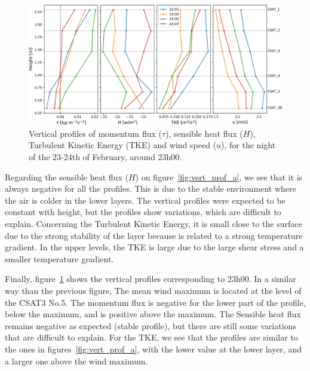 \begin{figure}[!ht]
    \centering
    \includegraphics[width=1\textwidth]{fig/chapter_4/23-24/vert_prof_b_speedmax.png}
    \caption{Vertical profiles of momentum flux ($\tau$), sensible heat flux ($H$), Turbulent Kinetic Energy (TKE) and wind speed ($u$), for the night of the 23-24th of February, around 23h00.}
    \label{fig:vert_prof_b}
\end{figure}

Regarding the sensible heat flux ($H$) on figure~\ref{fig:vert_prof_a}, we see that it is always negative for all the profiles. This is due to the stable environment where the air is colder in the lower layers. The vertical profiles were expected to be constant with height, but the profiles show variations, which are difficult to explain. Concerning the Turbulent Kinetic Energy, it is small close to the surface due to the strong stability of the layer because is related to a strong temperature gradient. In the upper levels, the TKE is large due to the large shear stress and a smaller temperature gradient.

Finally, figure~\ref{fig:vert_prof_b} shows the vertical profiles corresponding to 23h00. In a similar way than the previous figure, The mean wind maximum is located at the level of the CSAT3 No.5. The momentum flux is negative for the lower part of the profile, below the maximum, and is positive above the maximum. The Sensible heat flux remains negative as expected (stable profile), but there are still some variations that are difficult to explain. For the TKE, we see that the profiles are similar to the ones in figures~\ref{fig:vert_prof_a}, with the lower value at the lower layer, and a larger one above the wind maximum.